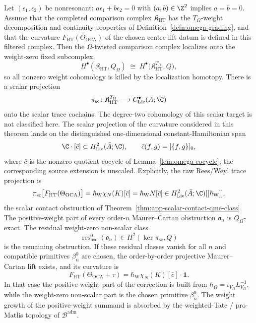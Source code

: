 \begin{thm}\label{thm:omega-localization-collapse}
Let \((\epsilon_1,\epsilon_2)\) be nonresonant:
\(a\epsilon_1+b\epsilon_2=0\) with \((a,b)\in\Z^2\) implies
\(a=b=0\).  Assume that the completed comparison complex
\(\mathfrak K_{\mathrm{HT}}\) has the \(T_\Omega\)-weight decomposition
and continuity properties of Definition~\ref{defn:omega-grading},
and that the curvature
\(F_{\mathrm{HT}}(\Theta_{\mathrm{OCA}})\) of the chosen centre-lift
datum is defined in this filtered complex.  Then the \(\Omega\)-twisted
comparison complex localizes onto the weight-zero fixed subcomplex,
\[
  H^\bullet(\mathfrak K_{\mathrm{HT}},Q_\Omega)
  \;\cong\;
  H^\bullet\bigl(\mathfrak K_{\mathrm{HT}}^{T_\Omega},Q\bigr),
\]
so all nonzero weight cohomology is killed by the localization homotopy.
There is a scalar projection
\[
  \pi_{\mathrm{sc}}\colon
  \mathfrak K_{\mathrm{HT}}^{T_\Omega}
  \longrightarrow C^\bullet_{\mathrm{Lie}}(\bar A;\C)
\]
onto the scalar trace cochains.  The degree-two cohomology of this
scalar target is not classified here.  The scalar projection of the
curvature considered in this theorem lands on the distinguished
one-dimensional constant-Hamiltonian span
\[
  \C\cdot[\bar c]\subset H^2_{\mathrm{Lie}}(\bar A;\C),
  \qquad \bar c(f,g)=[\{f,g\}]_0,
\]
where \(\bar c\) is the nonzero quotient cocycle of
Lemma~\ref{lem:omega-cocycle}; the corresponding source extension is
unscaled.  Explicitly, the raw Rees/Weyl trace projection is
  \[
    \pi_{\mathrm{sc}}\bigl[F_{\mathrm{HT}}(\Theta_{\mathrm{OCA}})\bigr]
  =\hbar_{\mathrm{W}}\chi_N(K)[\bar c]
  =\hbar_{\mathrm{W}}N[\bar c]
  \in H^2_{\mathrm{Lie}}(\bar A;\C)[[\hbar_{\mathrm{W}}]],
  \]
the scalar contact obstruction of
Theorem~\ref{thm:app-scalar-contact-qme-class}.
The positive-weight part of every order-\(n\) Maurer--Cartan obstruction
\(\mathfrak o_n\) is \(Q_\Omega\)-exact.  The residual weight-zero
non-scalar class
\[
  \operatorname{res}^{0}_{\mathrm{nsc}}(\mathfrak o_n)
  \in H^2(\ker\pi_{\mathrm{sc}},Q)
\]
is the remaining obstruction.  If these residual classes vanish for all
\(n\) and compatible primitives \(\beta_n^0\) are chosen, the
order-by-order projective Maurer--Cartan lift exists, and its curvature
is
\[
  F_{\mathrm{HT}}(\Theta_{\mathrm{OCA}}+\tau)
  =\hbar_{\mathrm{W}}\chi_N(K)[\bar c]\cdot\mathbf 1 .
\]
In that case the positive-weight part of the correction is built from
\(h_\Omega=\iota_{V_\Omega}L_{V_\Omega}^{-1}\), while the weight-zero
non-scalar part is the chosen primitive \(\beta_n^0\).  The weight growth
of the positive-weight summand is absorbed by the weighted-Tate /
pro-Matlis topology of \(\mathcal B^{\mathrm{adm}}\).
\end{thm}

